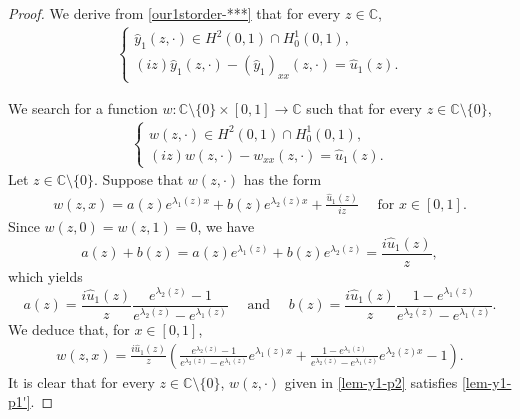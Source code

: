 \documentclass[11pt, reqno]{amsart}
\theoremstyle{plain}
\numberwithin{equation}{section}
\newcommand{\mC}{\mathbb{C}}
\newcommand{\hy}{\hat y}
\newcommand{\hu}{\hat u}
\begin{document}
\begin{proof}  We derive from \eqref{our1storder-***} that for every $z \in \mC$,
\begin{align}\label{lem-y1-p1}
    \begin{cases}    	
    		\hy_1(z, \cdot) \in H^2(0, 1) \cap H^1_0(0, 1), \\[6pt]      
        (iz) \hy_1(z, \cdot) - (\hy_1)_{xx} (z, \cdot) = \hu_1 (z).
    \end{cases}
    \end{align}

\medskip

We search for a function $w: \mC \setminus \{0\} \times [0, 1] \to \mC$ such that for every $z \in \mC \setminus \{0\}$, 
\begin{align}	\label{lem-y1-p1'}
	\begin{cases} 
		w(z, \cdot) \in H^2(0, 1) \cap H^1_0(0, 1), \\[6pt]
		(iz) w(z, \cdot) - w_{xx}(z, \cdot) = \hu_1(z). 
	\end{cases}
\end{align}
Let $z \in \mC \setminus \{0\}$. Suppose that $w(z, \cdot)$ has the form 
\begin{align*}
w(z, x) = a (z) e^{\lambda_1(z) x} + b (z) e^{\lambda_2(z) x} + \frac{\hu_1(z)}{iz} \quad \text{ for } x \in [0, 1].
\end{align*}
Since $w(z, 0) = w(z, 1) = 0$, we have 
$$
a(z) + b(z) =  a(z)e^{\lambda_1(z)} + b(z)e^{\lambda_2(z)} = \frac{i\hu_1(z)}{z},  
$$
which yields 
$$
a(z) = \frac{i \hu_1(z)}{z} \frac{e^{\lambda_2(z)} - 1}{e^{\lambda_2(z)} - e^{\lambda_1(z)}} \quad \mbox{ and } \quad b(z) = \frac{i \hu_1(z)}{z} \frac{1- e^{\lambda_1(z)}}{e^{\lambda_2(z)} - e^{\lambda_1(z)}}. 
$$
We deduce that, for $x \in [0, 1]$, 
 \begin{align}	\label{lem-y1-p2}
    		w(z, x) = \frac{i \hu_1(z)}{z} \left(\frac{e^{\lambda_2(z)} - 1}{e^{\lambda_2(z)} - e^{\lambda_1(z)}} e^{\lambda_1(z) x} + \frac{1 - e^{\lambda_1(z)}}{e^{\lambda_2(z)} - e^{\lambda_1(z)}} e^{\lambda_2(z) x} - 1 \right).
    \end{align}
It is clear that for every $z \in \mC \setminus \{0\}$, $w(z,\cdot)$ given in \eqref{lem-y1-p2} satisfies \eqref{lem-y1-p1'}.  


\medskip


\end{proof}
\end{document}

